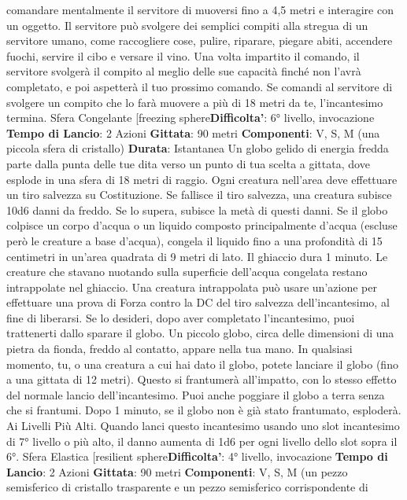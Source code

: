 \begin{multicols}{2}
comandare mentalmente il servitore di muoversi fino a
4,5 metri e interagire con un oggetto. Il servitore può
svolgere dei semplici compiti alla stregua di un servitore
umano, come raccogliere cose, pulire, riparare, piegare
abiti, accendere fuochi, servire il cibo e versare il vino.
Una volta impartito il comando, il servitore svolgerà il
compito al meglio delle sue capacità finché non l’avrà
completato, e poi aspetterà il tuo prossimo comando.
Se comandi al servitore di svolgere un compito che lo
farà muovere a più di 18 metri da te, l’incantesimo
termina.
Sfera Congelante
[freezing sphere\textbf{Difficolta'}:
6° livello, invocazione
\textbf{Tempo di Lancio}: 2 Azioni
\textbf{Gittata}: 90 metri
\textbf{Componenti}: V, S, M (una piccola sfera di cristallo)
\textbf{Durata}: Istantanea
Un globo gelido di energia fredda parte dalla punta
delle tue dita verso un punto di tua scelta a gittata, dove
esplode in una sfera di 18 metri di raggio. Ogni creatura
nell’area deve effettuare un tiro salvezza su
Costituzione. Se fallisce il tiro salvezza, una creatura
subisce 10d6 danni da freddo. Se lo supera, subisce la
metà di questi danni.
Se il globo colpisce un corpo d’acqua o un liquido
composto principalmente d’acqua (escluse però le
creature a base d’acqua), congela il liquido fino a una
profondità di 15 centimetri in un’area quadrata di 9 metri
di lato. Il ghiaccio dura 1 minuto. Le creature che
stavano nuotando sulla superficie dell’acqua congelata
restano intrappolate nel ghiaccio. Una creatura
intrappolata può usare un’azione per effettuare una
prova di Forza contro la DC del tiro salvezza
dell’incantesimo, al fine di liberarsi.
Se lo desideri, dopo aver completato l’incantesimo, puoi
trattenerti dallo sparare il globo. Un piccolo globo, circa
delle dimensioni di una pietra da fionda, freddo al
contatto, appare nella tua mano. In qualsiasi momento,
tu, o una creatura a cui hai dato il globo, potete lanciare
il globo (fino a una gittata di 12 metri). Questo si
frantumerà all’impatto, con lo stesso effetto del normale
lancio dell’incantesimo. Puoi anche poggiare il globo a
terra senza che si frantumi. Dopo 1 minuto, se il globo
non è già stato frantumato, esploderà.
Ai Livelli Più Alti. Quando lanci questo incantesimo
usando uno slot incantesimo di 7° livello o più alto, il
danno aumenta di 1d6 per ogni livello dello slot sopra il
6°.
Sfera Elastica
[resilient sphere\textbf{Difficolta'}:
4° livello, invocazione
\textbf{Tempo di Lancio}: 2 Azioni
\textbf{Gittata}: 90 metri
\textbf{Componenti}: V, S, M (un pezzo semisferico di cristallo
trasparente e un pezzo semisferico corrispondente di

\end{multicols}

